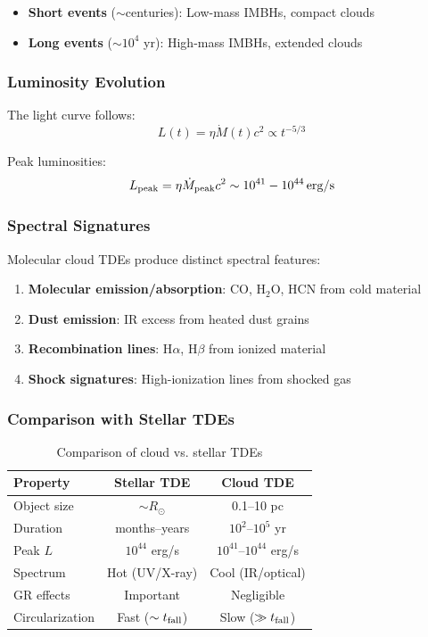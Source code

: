 \documentclass[twocolumn,amsmath,amssymb,prd,superscriptaddress,nofootinbib]{revtex4-2}
\begin{document}
\begin{itemize}
    \item \textbf{Short events} ($\sim$centuries): Low-mass IMBHs, compact clouds
    \item \textbf{Long events} ($\sim 10^4$ yr): High-mass IMBHs, extended clouds
\end{itemize}

\subsubsection{Luminosity Evolution}

The light curve follows:
\begin{equation}
    L(t) = \eta \dot{M}(t) c^2 \propto t^{-5/3}
    \label{eq:light_curve}
\end{equation}

Peak luminosities:
\begin{equation}
    L_{\rm peak} = \eta \dot{M}_{\rm peak} c^2 \sim 10^{41} - 10^{44}\,{\rm erg/s}
\end{equation}

\subsubsection{Spectral Signatures}

Molecular cloud TDEs produce distinct spectral features:
\begin{enumerate}
    \item \textbf{Molecular emission/absorption}: CO, H$_2$O, HCN from cold material
    \item \textbf{Dust emission}: IR excess from heated dust grains
    \item \textbf{Recombination lines}: H$\alpha$, H$\beta$ from ionized material
    \item \textbf{Shock signatures}: High-ionization lines from shocked gas
\end{enumerate}

\subsubsection{Comparison with Stellar TDEs}

\begin{table}[h]
\centering
\caption{Comparison of cloud vs. stellar TDEs}
\label{tab:comparison}
\begin{tabular}{lcc}
\toprule
Property & Stellar TDE & Cloud TDE \\
\midrule
Object size & $\sim R_\odot$ & 0.1--10 pc \\
Duration & months--years & $10^2$--$10^5$ yr \\
Peak $L$ & $10^{44}$ erg/s & $10^{41}$--$10^{44}$ erg/s \\
Spectrum & Hot (UV/X-ray) & Cool (IR/optical) \\
GR effects & Important & Negligible \\
Circularization & Fast ($\sim t_{\rm fall}$) & Slow ($\gg t_{\rm fall}$) \\
\bottomrule
\end{tabular}
\end{table}
\end{document}
